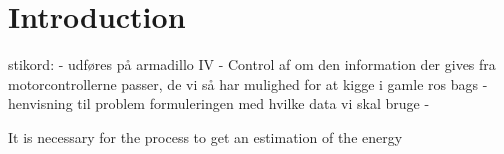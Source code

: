 \section{Introduction}


stikord:
	- udføres på armadillo IV
	- Control af om den information der gives fra motorcontrollerne passer, de vi så har mulighed for at kigge i gamle ros bags
	- henvisning til problem formuleringen med hvilke data vi skal bruge
	- 



It is necessary for the process to get an estimation of the energy 
